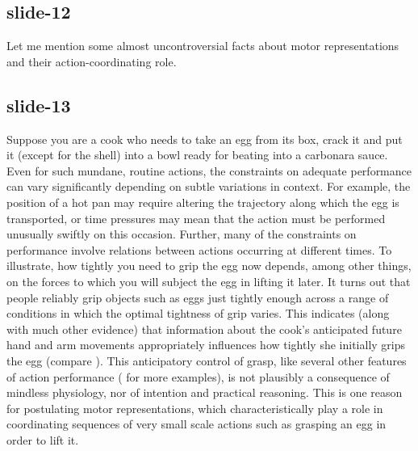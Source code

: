 \documentclass[12pt,\papersize]{extarticle}
\begin{document}
\subsection{slide-12}
Let me mention some almost uncontroversial facts about motor representations and
their action-coordinating role.

\subsection{slide-13}
Suppose you are a cook who needs to take an egg from its box, crack it and put it (except for the
shell) into a bowl ready for beating into a carbonara sauce.
Even for such mundane, routine actions, the constraints on adequate performance can vary
significantly depending on subtle variations in context. For example, the position of a hot pan
may require altering the trajectory along which the egg is transported, or time pressures may mean
that the action must be performed unusually swiftly on this occasion.
Further, many of the constraints on performance involve relations between actions occurring at
different times.
To illustrate, how tightly you need to grip the egg now depends, among other things, on the forces
to which you will subject the egg in lifting it later.
It turns out that people reliably grip objects such as eggs just tightly enough across a range of
conditions in which the optimal tightness of grip varies.
This indicates (along with much other evidence) that information about the cook’s anticipated
future hand and arm movements appropriately influences how tightly she initially grips the egg
(compare \citealp{kawato:1999_internal}).
This anticipatory control of grasp,
like several other features of action performance (\citealp[see][chapter 1]{rosenbaum:2010_human} for more examples),
is not plausibly a consequence of mindless physiology, nor of intention and practical reasoning.
This is one reason for postulating motor representations, which characteristically play a role in
coordinating sequences of very small scale actions such as grasping an egg in order to lift it.
\end{document}
